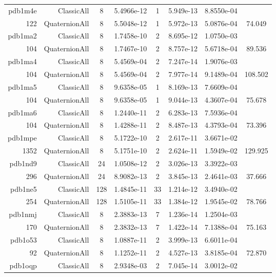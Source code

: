 \begin{xltabular}{\textwidth}{r|rcS[table-format=1.4e+2]cS[table-format=1.3e+2]S[table-format=1.4e+2]S[table-format=-1.3]}
pdb1m4e & ClassicAll & 8 & 5.4966e-12 & 1 & 5.949e-13 & 8.8550e-04 & \\
122 & QuaternionAll & 8 & 5.5048e-12 & 1 & 5.972e-13 & 5.0876e-04 & 74.049\\  \addlinespace
pdb1ma2 & ClassicAll & 8 & 1.7458e-10 & 2 & 8.695e-12 & 1.0750e-03 & \\
104 & QuaternionAll & 8 & 1.7467e-10 & 2 & 8.757e-12 & 5.6718e-04 & 89.536\\  \addlinespace
pdb1ma4 & ClassicAll & 8 & 5.4569e-04 & 2 & 7.247e-14 & 1.9076e-03 & \\
104 & QuaternionAll & 8 & 5.4569e-04 & 2 & 7.977e-14 & 9.1489e-04 & 108.502\\  \addlinespace
pdb1ma5 & ClassicAll & 8 & 9.6358e-05 & 1 & 8.169e-13 & 7.6609e-04 & \\
104 & QuaternionAll & 8 & 9.6358e-05 & 1 & 9.044e-13 & 4.3607e-04 & 75.678\\  \addlinespace
pdb1ma6 & ClassicAll & 8 & 1.2440e-11 & 2 & 6.283e-13 & 7.5936e-04 & \\
104 & QuaternionAll & 8 & 1.4288e-11 & 2 & 8.487e-13 & 4.3793e-04 & 73.396\\  \addlinespace
pdb1mpe & ClassicAll & 8 & 5.1722e-10 & 2 & 2.617e-11 & 3.6671e-02 & \\
1352 & QuaternionAll & 8 & 5.1751e-10 & 2 & 2.624e-11 & 1.5949e-02 & 129.925\\  \addlinespace
pdb1nd9 & ClassicAll & 24 & 1.0508e-12 & 2 & 3.026e-13 & 3.3922e-03 & \\
296 & QuaternionAll & 24 & 8.9082e-13 & 2 & 3.845e-13 & 2.4641e-03 & 37.666\\  \addlinespace
pdb1ne5 & ClassicAll & 128 & 1.4845e-11 & 33 & 1.214e-12 & 3.4940e-02 & \\
254 & QuaternionAll & 128 & 1.5105e-11 & 33 & 1.384e-12 & 1.9545e-02 & 78.766\\  \addlinespace
pdb1nmj & ClassicAll & 8 & 2.3883e-13 & 7 & 1.236e-14 & 1.2504e-03 & \\
170 & QuaternionAll & 8 & 2.3832e-13 & 7 & 1.422e-14 & 7.1388e-04 & 75.163\\  \addlinespace
pdb1o53 & ClassicAll & 8 & 1.0887e-11 & 2 & 3.999e-13 & 6.6011e-04 & \\
92 & QuaternionAll & 8 & 1.1252e-11 & 2 & 4.527e-13 & 3.8185e-04 & 72.870\\  \addlinespace
pdb1oqp & ClassicAll & 8 & 2.9348e-03 & 2 & 7.045e-14 & 3.0012e-02 & \\

\end{xltabular}
